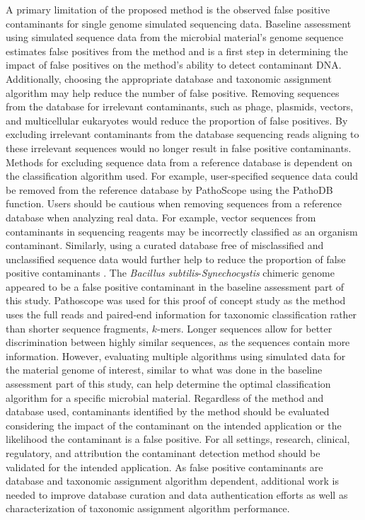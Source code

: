 \documentclass[fleqn,10pt,lineno]{wlpeerj}\usepackage[]{graphicx}\usepackage[]{color}
\begin{document}
A primary limitation of the proposed method is the observed false positive contaminants for single genome simulated sequencing data. 
Baseline assessment using simulated sequence data from the microbial material's genome sequence estimates false positives from the method and is a first step in determining the impact of false positives on the method's ability to detect contaminant DNA. 
Additionally, choosing the appropriate database and taxonomic assignment algorithm may help reduce the number of false positive.
Removing sequences from the database for irrelevant contaminants, such as phage, plasmids, vectors, and multicellular eukaryotes would reduce the proportion of false positives. 
By excluding irrelevant contaminants from the database sequencing reads aligning to these irrelevant sequences would no longer result in false positive contaminants. 
Methods for excluding sequence data from a reference database is dependent on the classification algorithm used. 
For example, user-specified sequence data could be removed from the reference database by PathoScope using the PathoDB function. 
Users should be cautious when removing sequences from a reference database when analyzing real data. 
For example, vector sequences from contaminants in sequencing reagents may be incorrectly classified as an organism contaminant. 
Similarly, using a curated database free of misclassified and unclassified sequence data would further help to reduce the proportion of false positive contaminants \citep{tennessen2015prodege}. 
The \textit{Bacillus subtilis}-\textit{Synechocystis} chimeric genome appeared to be a false positive contaminant in the baseline assessment part of this study. 
Pathoscope was used for this proof of concept study as the method uses the full reads and paired-end information for taxonomic classification rather than shorter sequence fragments, $k$-mers. 
Longer sequences allow for better discrimination between highly similar sequences, as the sequences contain more information. 
However, evaluating multiple algorithms using simulated data for the material genome of interest, 
similar to what was done in the baseline assessment part of this study, 
can help determine the optimal classification algorithm for a specific microbial material. 
Regardless of the method and database used, contaminants identified by the method should be evaluated considering the impact of the contaminant on the intended application or the likelihood the contaminant is a false positive. 
For all settings, research, clinical, regulatory, and attribution the contaminant detection method should be validated for the intended application. 
As false positive contaminants are database and taxonomic assignment algorithm dependent, additional work is needed to improve database curation and data authentication efforts as well as characterization of taxonomic assignment algorithm performance.  
\end{document}
